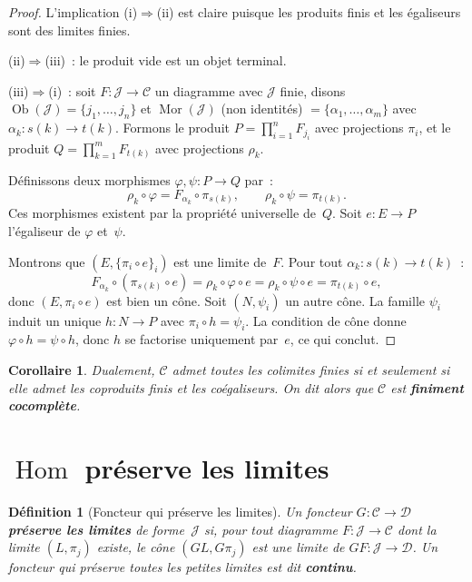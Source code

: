 \documentclass[a4paper,12pt]{book}
\DeclareMathOperator{\Hom}{Hom}
\DeclareMathOperator{\Ob}{Ob}
\DeclareMathOperator{\Mor}{Mor}
\newtheorem{corollaire}[theoreme]{Corollaire}
\newtheorem{definition}[theoreme]{Définition}
\begin{document}
\begin{proof}
L'implication (i)$\Rightarrow$(ii) est claire puisque les produits finis
et les égaliseurs sont des limites finies.

(ii)$\Rightarrow$(iii)~: le produit vide est un objet terminal.

(iii)$\Rightarrow$(i)~: soit $F\colon\mathcal{J}\to\mathcal{C}$ un diagramme
avec $\mathcal{J}$ finie, disons $\Ob(\mathcal{J})=\{j_1,\dots,j_n\}$
et $\Mor(\mathcal{J})$ (non identités) $= \{\alpha_1,\dots,\alpha_m\}$
avec $\alpha_k\colon s(k)\to t(k)$.
Formons le produit $P = \prod_{i=1}^n F_{j_i}$ avec projections $\pi_i$,
et le produit $Q = \prod_{k=1}^m F_{t(k)}$ avec projections $\rho_k$.

Définissons deux morphismes $\varphi,\psi\colon P\to Q$ par~:
\[
    \rho_k\circ\varphi = F_{\alpha_k}\circ\pi_{s(k)},
    \qquad
    \rho_k\circ\psi = \pi_{t(k)}.
\]
Ces morphismes existent par la propriété universelle de~$Q$.
Soit $e\colon E\to P$ l'égaliseur de $\varphi$ et~$\psi$.

Montrons que $(E, \{\pi_i\circ e\}_i)$ est une limite de~$F$.
Pour tout $\alpha_k\colon s(k)\to t(k)$~:
\[
    F_{\alpha_k}\circ(\pi_{s(k)}\circ e)
    = \rho_k\circ\varphi\circ e
    = \rho_k\circ\psi\circ e
    = \pi_{t(k)}\circ e,
\]
donc $(E, \pi_i\circ e)$ est bien un cône.
Soit $(N,\psi_i)$ un autre cône. La famille $\psi_i$ induit un unique
$h\colon N\to P$ avec $\pi_i\circ h = \psi_i$.
La condition de cône donne $\varphi\circ h = \psi\circ h$, donc
$h$ se factorise uniquement par~$e$, ce qui conclut.
\end{proof}

\begin{corollaire}\label{cor:existence-colimites-finies}
Dualement, $\mathcal{C}$ admet toutes les colimites finies
si et seulement si elle admet les coproduits finis et les coégaliseurs.
On dit alors que $\mathcal{C}$ est \textbf{finiment cocomplète}.
\end{corollaire}


\section{$\Hom$ préserve les limites}\label{sec:hom-preserve-limites}

\begin{definition}[Foncteur qui préserve les limites]\label{def:preservation-limites}
Un foncteur $G\colon\mathcal{C}\to\mathcal{D}$ \textbf{préserve les limites}
de forme~$\mathcal{J}$ si, pour tout diagramme $F\colon\mathcal{J}\to\mathcal{C}$
dont la limite $(L,\pi_j)$ existe, le cône $(GL, G\pi_j)$ est une limite de
$GF\colon\mathcal{J}\to\mathcal{D}$.
Un foncteur qui préserve toutes les petites limites est dit \textbf{continu}.
\end{definition}
\end{document}
